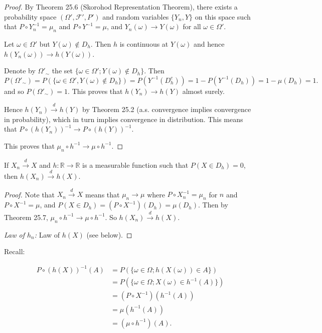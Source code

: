 \begin{proof}
By Theorem 25.6 (Skorohod Representation Theorem), there exists a probability space \((\Omega', \mathcal{F}', P')\) and random variables \( \{Y_n, Y\} \) on this space such that \( P \circ Y_n^{-1} = \mu_n \) and \( P \circ Y^{-1} = \mu \), and \( Y_n(\omega) \rightarrow Y(\omega) \) for all \(\omega \in \Omega'\).

Let \(\omega \in \Omega'\) but \(Y(\omega) \notin D_h\). Then \(h\) is continuous at \(Y(\omega)\) and hence \(h(Y_n(\omega)) \rightarrow h(Y(\omega))\).

Denote by \( \Omega'_{\sim} \) the set \( \{\omega \in \Omega'; Y(\omega) \notin D_h\} \). Then
\[ P(\Omega'_{\sim}) = P(\{\omega \in \Omega', Y(\omega) \notin D_h\}) = P(Y^{-1}(D_h^c)) = 1 - P(Y^{-1}(D_h)) = 1 - \mu(D_h) = 1. \]
and so \( P(\Omega'_{\sim}) = 1 \). This proves that \( h(Y_n) \rightarrow h(Y) \) almost surely.

Hence \( h(Y_n) \xrightarrow{d} h(Y) \) by Theorem 25.2 (a.s. convergence implies convergence in probability), which in turn implies convergence in distribution. This means that \( P \circ (h(Y_n))^{-1} \rightarrow P \circ (h(Y))^{-1} \).

This proves that \( \mu_n \circ h^{-1} \rightarrow \mu \circ h^{-1} \).
\end{proof}

\begin{corollary}
If \( X_n \xrightarrow{d} X \) and \( h: \mathbb{R} \rightarrow \mathbb{R} \) is a measurable function such that \( P(X \in D_h) = 0 \), then \( h(X_n) \xrightarrow{d} h(X) \).
\end{corollary}


\begin{proof}
Note that \( X_n \xrightarrow{d} X \) means that \( \mu_n \rightarrow \mu \) where \( P \circ X_n^{-1} = \mu_n \) for \( n \) and \( P \circ X^{-1} = \mu \), and \( P(X \in D_h) = (P \circ X^{-1})(D_h) = \mu(D_h) \). Then by Theorem 25.7, \( \mu_n \circ h^{-1} \rightarrow \mu \circ h^{-1} \). So \( h(X_n) \xrightarrow{d} h(X) \).

\textit{Law of $h_n$:} Law of $h(X)$ (see below).
\end{proof}


Recall: 

\begin{align*}
P \circ (h(X))^{-1}(A) &= P(\{\omega \in \Omega ; h(X(\omega)) \in A\}) \\
&= P(\{\omega \in \Omega ; X(\omega) \in h^{-1}(A)\}) \\
&= (P \circ X^{-1})(h^{-1}(A)) \\
&= \mu(h^{-1}(A)) \\
&= (\mu \circ h^{-1})(A).
\end{align*}

